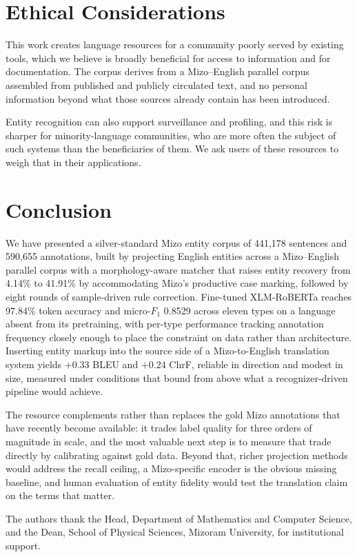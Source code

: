 \documentclass[acmsmall,screen,review]{acmart}
\begin{document}
\section{Ethical Considerations}
\label{sec:ethics}

This work creates language resources for a community poorly served by existing
tools, which we believe is broadly beneficial for access to information and for
documentation. The corpus derives from a Mizo--English parallel corpus assembled
from published and publicly circulated text, and no personal information beyond
what those sources already contain has been introduced.

Entity recognition can also support surveillance and profiling, and this risk is
sharper for minority-language communities, who are more often the subject of
such systems than the beneficiaries of them. We ask users of these resources to
weigh that in their applications.

\section{Conclusion}
\label{sec:conclusion}

We have presented a silver-standard Mizo entity corpus of 441,178 sentences and
590,655 annotations, built by projecting English entities across a
Mizo--English parallel corpus with a morphology-aware matcher that raises entity
recovery from 4.14\% to 41.91\% by accommodating Mizo's productive case marking,
followed by eight rounds of sample-driven rule correction. Fine-tuned
XLM-RoBERTa reaches 97.84\% token accuracy and micro-$F_1$ 0.8529 across eleven
types on a language absent from its pretraining, with per-type performance
tracking annotation frequency closely enough to place the constraint on data
rather than architecture. Inserting entity markup into the source side of a
Mizo-to-English translation system yields $+0.33$ BLEU and $+0.24$ ChrF,
reliable in direction and modest in size, measured under conditions that bound
from above what a recognizer-driven pipeline would achieve.

The resource complements rather than replaces the gold Mizo annotations that
have recently become available: it trades label quality for three orders of
magnitude in scale, and the most valuable next step is to measure that trade
directly by calibrating against gold data. Beyond that, richer projection
methods would address the recall ceiling, a Mizo-specific encoder is the obvious
missing baseline, and human evaluation of entity fidelity would test the
translation claim on the terms that matter.

\begin{acks}
The authors thank the Head, Department of Mathematics and Computer Science, and
the Dean, School of Physical Sciences, Mizoram University, for institutional
support.
\end{acks}



\end{document}
